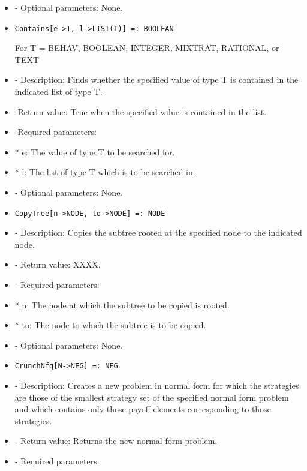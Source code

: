 \begin{itemize}
\item
- Optional parameters:  None.
\ed

\item
\begin{verbatim}
Contains[e->T, l->LIST(T)] =: BOOLEAN
\end{verbatim}

For T = BEHAV, BOOLEAN, INTEGER, MIXTRAT, RATIONAL, or TEXT

\bd
\item
- Description:  Finds whether the specified value of type T is
contained in the indicated list of type T.
\item 
-Return value:  True when the specified value is contained in the list.
\item
-Required parameters:
	
\bd
\item	
*  e:  The value of type T to be searched for.
\item
*  l:  The list of type T which is to be searched in.
\ed

\item
- Optional parameters:  None.
\ed

\item

\begin{verbatim}
CopyTree[n->NODE, to->NODE] =: NODE
\end{verbatim}

\bd
\item
- Description:  Copies the subtree rooted at the specified node to the
indicated node.
\item
- Return value:  XXXX.
\item
- Required parameters:

\bd
\item	
*  n:  The node at which the subtree to be copied is rooted.
\item
*  to:  The node to which the subtree is to be copied.
\ed

\item
- Optional parameters:  None.
\ed

\item
\begin{verbatim}
CrunchNfg[N->NFG] =: NFG
\end{verbatim}

\bd
\item
- Description:  Creates a new problem in normal form for which the 
strategies are those of the smallest strategy set of the specified
normal form problem and which contains only those payoff elements 
corresponding to those strategies.
\item
- Return value:  Returns the new normal form problem.
\item
- Required parameters:
	

\end{itemize}
